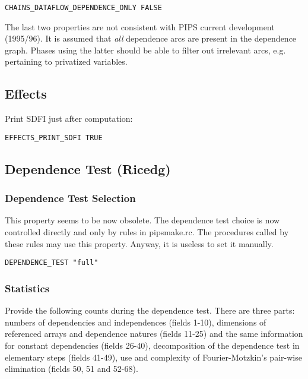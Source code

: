 \begin{verbatim}
CHAINS_DATAFLOW_DEPENDENCE_ONLY FALSE
\end{verbatim}

The last two properties are not consistent with PIPS current development
(1995/96). It is assumed that {\em all} dependence arcs are present in the
dependence graph. Phases using the latter should be able to filter out
irrelevant arcs, e.g. pertaining to privatized variables.

\subsection{Effects}

Print SDFI just after computation:

\begin{verbatim}
EFFECTS_PRINT_SDFI TRUE
\end{verbatim}


\subsection{Dependence Test (Ricedg)}


\subsubsection{Dependence Test Selection}

This property seems to be now obsolete. The dependence test choice is
now controlled directly and only by rules in pipsmake.rc. The procedures
called by these rules may use this property. Anyway, it is useless to
set it manually.

\begin{verbatim}
DEPENDENCE_TEST "full"
\end{verbatim}

\subsubsection{Statistics}

Provide the following counts during the dependence test. There are three
parts: numbers of dependencies and independences (fields 1-10),
dimensions of referenced arrays and dependence natures (fields 11-25)
and the same information for constant dependencies (fields 26-40),
decomposition of the dependence test in elementary steps (fields 41-49),
use and complexity of Fourier-Motzkin's pair-wise elimination (fields
50, 51 and 52-68).

